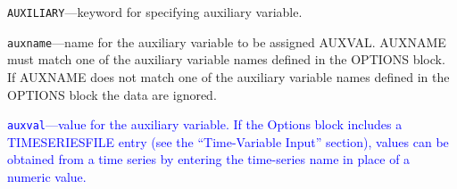 \begin{description}
\item \texttt{AUXILIARY}---keyword for specifying auxiliary variable.

\item \texttt{auxname}---name for the auxiliary variable to be assigned AUXVAL.  AUXNAME must match one of the auxiliary variable names defined in the OPTIONS block. If AUXNAME does not match one of the auxiliary variable names defined in the OPTIONS block the data are ignored.

\item \textcolor{blue}{\texttt{auxval}---value for the auxiliary variable. If the Options block includes a TIMESERIESFILE entry (see the ``Time-Variable Input'' section), values can be obtained from a time series by entering the time-series name in place of a numeric value.}

\end{description}

